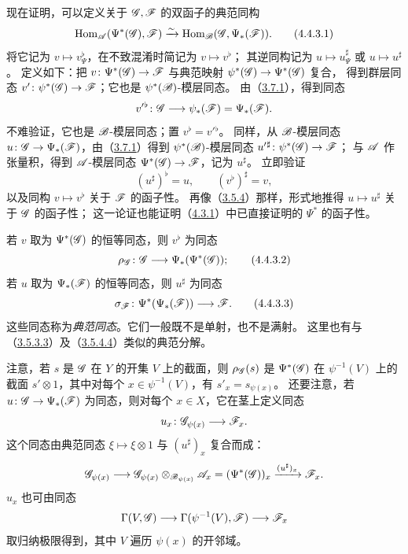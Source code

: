 现在证明，可以定义关于 $\mathscr G,\mathscr F$ 的双函子的典范同构
\begin{equation}
 \operatorname{Hom}_{\mathscr A}(\Psi^*(\mathscr G),\mathscr F)
 \xrightarrow{\sim}\operatorname{Hom}_{\mathscr B}(\mathscr G,\Psi_*(\mathscr F)).
 \tag{4.4.3.1}\label{eq:0:4.4.3.1}
\end{equation}
将它记为 $v\mapsto v^\flat_{\Psi}$，在不致混淆时简记为 $v\mapsto v^\flat$；
其逆同构记为 $u\mapsto u^\sharp_{\Psi}$ 或 $u\mapsto u^\sharp$。
定义如下：把 $v\colon\Psi^*(\mathscr G)\to\mathscr F$ 与典范映射 $\psi^*(\mathscr G)\to\Psi^*(\mathscr G)$ 复合，
得到群层同态 $v'\colon\psi^*(\mathscr G)\to\mathscr F$；它也是 $\psi^*(\mathscr B)$-模层同态。
由（\hyperlink{para:0:3.7.1}{3.7.1}），得到同态
\[
 v'{}^\flat\colon\mathscr G\longrightarrow\psi_*(\mathscr F)=\Psi_*(\mathscr F).
\]
不难验证，它也是 $\mathscr B$-模层同态；置 $v^\flat=v'{}^\flat$。
同样，从 $\mathscr B$-模层同态 $u\colon\mathscr G\to\Psi_*(\mathscr F)$，由（\hyperlink{para:0:3.7.1}{3.7.1}）得到
$\psi^*(\mathscr B)$-模层同态 $u'{}^\sharp\colon\psi^*(\mathscr G)\to\mathscr F$；
与 $\mathscr A$ 作张量积，得到 $\mathscr A$-模层同态 $\Psi^*(\mathscr G)\to\mathscr F$，记为 $u^\sharp$。
立即验证
\[
 (u^\sharp)^\flat=u,\qquad(v^\flat)^\sharp=v,
\]
以及同构 $v\mapsto v^\flat$ 关于 $\mathscr F$ 的函子性。
再像（\hyperlink{para:0:3.5.4}{3.5.4}）那样，形式地推得 $u\mapsto u^\sharp$ 关于 $\mathscr G$ 的函子性；
这一论证也能证明（\hyperlink{para:0:4.3.1}{4.3.1}）中已直接证明的 $\Psi^*$ 的函子性。

若 $v$ 取为 $\Psi^*(\mathscr G)$ 的恒等同态，则 $v^\flat$ 为同态
\begin{equation}
 \rho_{\mathscr G}\colon\mathscr G\longrightarrow\Psi_*(\Psi^*(\mathscr G));
 \tag{4.4.3.2}\label{eq:0:4.4.3.2}
\end{equation}
若 $u$ 取为 $\Psi_*(\mathscr F)$ 的恒等同态，则 $u^\sharp$ 为同态
\begin{equation}
 \sigma_{\mathscr F}\colon\Psi^*(\Psi_*(\mathscr F))\longrightarrow\mathscr F.
 \tag{4.4.3.3}\label{eq:0:4.4.3.3}
\end{equation}
这些同态称为\emph{典范同态}。它们一般既不是单射，也不是满射。
这里也有与（\hyperref[eq:0:3.5.3.3]{3.5.3.3}）及（\hyperref[eq:0:3.5.4.4]{3.5.4.4}）类似的典范分解。

注意，若 $s$ 是 $\mathscr G$ 在 $Y$ 的开集 $V$ 上的截面，则 $\rho_{\mathscr G}(s)$ 是
$\Psi^*(\mathscr G)$ 在 $\psi^{-1}(V)$ 上的截面 $s'\otimes1$，其中对每个
$x\in\psi^{-1}(V)$，有 $s'_x=s_{\psi(x)}$。
还要注意，若 $u\colon\mathscr G\to\Psi_*(\mathscr F)$ 为同态，则对每个 $x\in X$，它在茎上定义同态
\[
 u_x\colon\mathscr G_{\psi(x)}\longrightarrow\mathscr F_x.
\]
这个同态由典范同态 $\xi\mapsto\xi\otimes1$ 与 $(u^\sharp)_x$ 复合而成：
\[
 \mathscr G_{\psi(x)}\longrightarrow
 \mathscr G_{\psi(x)}\otimes_{\mathscr B_{\psi(x)}}\mathscr A_x
 =(\Psi^*(\mathscr G))_x
 \xrightarrow{(u^\sharp)_x}\mathscr F_x.
\]
$u_x$ 也可由同态
\[
 \Gamma(V,\mathscr G)\longrightarrow\Gamma(\psi^{-1}(V),\mathscr F)
 \longrightarrow\mathscr F_x
\]
取归纳极限得到，其中 $V$ 遍历 $\psi(x)$ 的开邻域。

